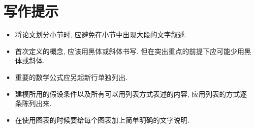 \documentclass[openany]{ctexbook}
\begin{document}
\chapter{写作提示}
    \begin{itemize}
        \item 将论文划分小节时, 应避免在小节中出现大段的文字叙述.
        \item 首次定义的概念, 应该用黑体或斜体书写. 但在突出重点的前提下应可能少用黑体或斜体.
        \item 重要的数学公式应另起新行单独列出.
        \item 建模所用的假设条件以及所有可以用列表方式表述的内容, 应用列表的方式逐条陈列出来.
        \item 在使用图表的时候要给每个图表加上简单明确的文字说明.
    \end{itemize}
\end{document}

